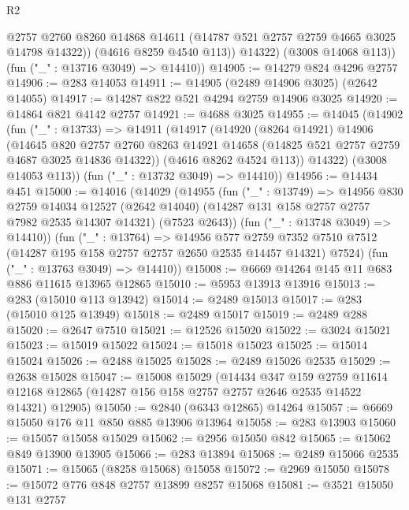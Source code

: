 \begin{lexlean}{R2}
\begin{coremodule}
              @2757
              @2760
              @8260
              @14868
              @14611
              (@14787 @521 @2757 @2759 @4665 @3025 @14798 @14322))
            (@4616 @8259 @4540 @113))
          @14322)
        (@3008 @14068 @113))
      (fun ("_" : @13716 @3049) => @14410))
@14905 := @14279 @824 @4296 @2757
@14906 := @283 @14053
@14911 := @14905 (@2489 @14906 @3025) (@2642 @14055)
@14917 := @14287 @822 @521 @4294 @2759 @14906 @3025
@14920 := @14864 @821 @4142 @2757
@14921 := @4688 @3025
@14955 := @14045
    (@14902
      (fun ("_" : @13733) =>
      @14911
        (@14917
          (@14920
            (@8264 @14921)
            @14906
            (@14645
              @820
              @2757
              @2760
              @8263
              @14921
              @14658
              (@14825 @521 @2757 @2759 @4687 @3025 @14836 @14322))
            (@4616 @8262 @4524 @113))
          @14322)
        (@3008 @14053 @113))
      (fun ("_" : @13732 @3049) => @14410))
@14956 := @14434 @451
@15000 := @14016
    (@14029
      (@14955
        (fun ("_" : @13749) =>
        @14956
          @830
          @2759
          @14034
          @12527
          (@2642 @14040)
          (@14287 @131 @158 @2757 @2757 @7982 @2535 @14307 @14321)
          (@7523 @2643))
        (fun ("_" : @13748 @3049) => @14410))
      (fun ("_" : @13764) =>
      @14956
        @577
        @2759
        @7352
        @7510
        @7512
        (@14287 @195 @158 @2757 @2757 @2650 @2535 @14457 @14321)
        @7524)
      (fun ("_" : @13763 @3049) => @14410))
@15008 := @6669 @14264 @145 @11 @683 @886 @11615 @13965 @12865
@15010 := @5953 @13913 @13916
@15013 := @283 (@15010 @113 @13942)
@15014 := @2489 @15013
@15017 := @283 (@15010 @125 @13949)
@15018 := @2489 @15017
@15019 := @2489 @288
@15020 := @2647 @7510
@15021 := @12526 @15020
@15022 := @3024 @15021
@15023 := @15019 @15022
@15024 := @15018 @15023
@15025 := @15014 @15024
@15026 := @2488 @15025
@15028 := @2489 @15026 @2535
@15029 := @2638 @15028
@15047 := @15008
    @15029
    (@14434
      @347
      @159
      @2759
      @11614
      @12168
      @12865
      (@14287 @156 @158 @2757 @2757 @2646 @2535 @14522 @14321)
      @12905)
@15050 := @2840 (@6343 @12865) @14264
@15057 := @6669 @15050 @176 @11 @850 @885 @13906 @13964
@15058 := @283 @13903
@15060 := @15057 @15058 @15029
@15062 := @2956 @15050 @842
@15065 := @15062 @849 @13900 @13905
@15066 := @283 @13894
@15068 := @2489 @15066 @2535
@15071 := @15065 (@8258 @15068) @15058
@15072 := @2969 @15050
@15078 := @15072 @776 @848 @2757 @13899 @8257 @15068
@15081 := @3521 @15050 @131 @2757

\end{coremodule}
\end{lexlean}
